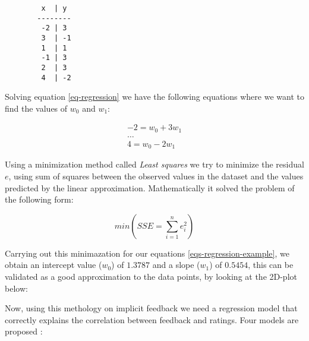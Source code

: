 \begin{figure}[H]
  \centering
  \begin{BVerbatim}
   x  | y  
  --------
   -2 | 3
   3  | -1
   1  | 1
   -1 | 3
   2  | 3
   4  | -2
  \end{BVerbatim}
\end{figure}

Solving equation \ref{eq-regression} we have the following equations where we
want to find the values of $w_0$ and $w_1$:

\begin{equation}
  \label{eqs-regression-example}
  \begin{split}
    -2 = w_0 + 3 w_1 \\
    \dots \\
    4 = w_0 - 2 w_1
  \end{split}
\end{equation}


Using a minimization method called \textit{Least squares} we try to minimize
the residual $e$, using sum of squares between the observed values in the
dataset and the values predicted by the linear approximation. Mathematically it
solved the problem of the following form:

\begin{equation}
  min (SSE = \sum_{i=1}^{n} e_i^2)
\end{equation}

Carrying out this minimazation for our equations \ref{eqs-regression-example},
we obtain an intercept value ($w_0$) of $1.3787$ and a slope ($w_1$) of
$0.5454$, this can be validated as a good approximation to the data points, by
looking at the 2D-plot below:

\begin{figure}[H]
  \centering
\end{figure}

Now, using this methology on implicit feedback we need a regression model that
correctly explains the correlation between feedback and ratings. Four models
are proposed :

